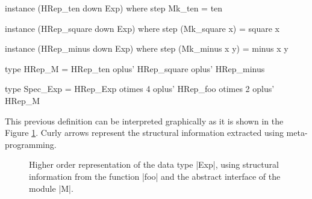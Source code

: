 \begin{code}
instance (HRep_ten down Exp) where
  step Mk_ten = ten

instance (HRep_square down Exp) where
  step (Mk_square x) = square x

instance (HRep_minus down Exp) where
  step (Mk_minus x y) = minus x y
\end{code}

\begin{code}
type HRep_M  =       HRep_ten
             oplus'  HRep_square
             oplus'  HRep_minus
\end{code}



\begin{code}
type Spec_Exp  =       HRep_Exp  otimes 4
               oplus'  HRep_foo  otimes 2
               oplus'  HRep_M
\end{code}

This previous definition can be interpreted graphically as it is shown in the
Figure \ref{fig:hrep}.
%
Curly arrows represent the structural information extracted using
meta-programming.

\begin{figure}[t]
  \centering
  
  \caption{Higher order representation of the data type |Exp|, using structural
    information from the function |foo| and the abstract interface of the module
    |M|.}
  \label{fig:hrep}
\end{figure}


